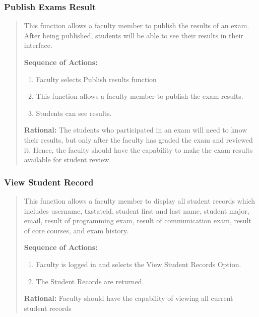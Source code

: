    \subsubsection{Publish Exams Result} 
   \begin{quote} %
         This function allows a faculty member to publish the results of an
         exam. After being published, students will be able to see their
         results in their interface.
         
         \textbf{Sequence of Actions:}
         \begin{enumerate}
            \item Faculty selects Publish results function
            \item This function allows a faculty member to publish the exam results.
            \item Students can see results.
      \end{enumerate}

         \textbf{Rational:}
         The students who participated in an exam will need to know their
         results, but only after the faculty has graded the exam and reviewed
         it. Hence, the faculty should have the capability to make the exam
         results available for student review.
   \end{quote} %

   \subsubsection{View Student Record} 
   \begin{quote} %
         This function allows a faculty member to display all student records
         which includes username, txstateid, student first and last name,
         student major, email, result of programming exam, result of
         communication exam, result of core courses, and exam history.
         
         \textbf{Sequence of Actions:}
         \begin{enumerate}
            \item Faculty is logged in and selects the View Student Records Option.
            \item The Student Records are returned.
      \end{enumerate}

         \textbf{Rational:}
         Faculty should have the capability of viewing all current student
         records
   \end{quote} %

